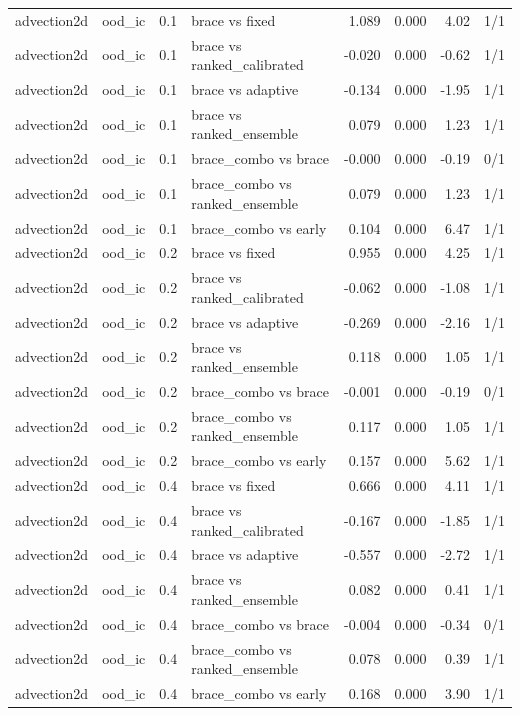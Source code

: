 \begin{tabular}{llllrrrr}
advection2d & ood\_ic & 0.1 & brace vs fixed & 1.089 & 0.000 & 4.02 & 1/1 \\
advection2d & ood\_ic & 0.1 & brace vs ranked\_calibrated & -0.020 & 0.000 & -0.62 & 1/1 \\
advection2d & ood\_ic & 0.1 & brace vs adaptive & -0.134 & 0.000 & -1.95 & 1/1 \\
advection2d & ood\_ic & 0.1 & brace vs ranked\_ensemble & 0.079 & 0.000 & 1.23 & 1/1 \\
advection2d & ood\_ic & 0.1 & brace\_combo vs brace & -0.000 & 0.000 & -0.19 & 0/1 \\
advection2d & ood\_ic & 0.1 & brace\_combo vs ranked\_ensemble & 0.079 & 0.000 & 1.23 & 1/1 \\
advection2d & ood\_ic & 0.1 & brace\_combo vs early & 0.104 & 0.000 & 6.47 & 1/1 \\
advection2d & ood\_ic & 0.2 & brace vs fixed & 0.955 & 0.000 & 4.25 & 1/1 \\
advection2d & ood\_ic & 0.2 & brace vs ranked\_calibrated & -0.062 & 0.000 & -1.08 & 1/1 \\
advection2d & ood\_ic & 0.2 & brace vs adaptive & -0.269 & 0.000 & -2.16 & 1/1 \\
advection2d & ood\_ic & 0.2 & brace vs ranked\_ensemble & 0.118 & 0.000 & 1.05 & 1/1 \\
advection2d & ood\_ic & 0.2 & brace\_combo vs brace & -0.001 & 0.000 & -0.19 & 0/1 \\
advection2d & ood\_ic & 0.2 & brace\_combo vs ranked\_ensemble & 0.117 & 0.000 & 1.05 & 1/1 \\
advection2d & ood\_ic & 0.2 & brace\_combo vs early & 0.157 & 0.000 & 5.62 & 1/1 \\
advection2d & ood\_ic & 0.4 & brace vs fixed & 0.666 & 0.000 & 4.11 & 1/1 \\
advection2d & ood\_ic & 0.4 & brace vs ranked\_calibrated & -0.167 & 0.000 & -1.85 & 1/1 \\
advection2d & ood\_ic & 0.4 & brace vs adaptive & -0.557 & 0.000 & -2.72 & 1/1 \\
advection2d & ood\_ic & 0.4 & brace vs ranked\_ensemble & 0.082 & 0.000 & 0.41 & 1/1 \\
advection2d & ood\_ic & 0.4 & brace\_combo vs brace & -0.004 & 0.000 & -0.34 & 0/1 \\
advection2d & ood\_ic & 0.4 & brace\_combo vs ranked\_ensemble & 0.078 & 0.000 & 0.39 & 1/1 \\
advection2d & ood\_ic & 0.4 & brace\_combo vs early & 0.168 & 0.000 & 3.90 & 1/1 \\
\bottomrule
\end{tabular}
